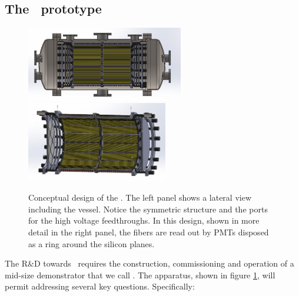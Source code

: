 \subsection{The \HDEMO\ prototype}

\begin{figure}
  \begin{center}
    \includegraphics[width=0.61\textwidth]{img2/nhd_vessel.jpg}
    \includegraphics[width=0.55\textwidth]{img2/nhd_view.jpg}
    \caption{Conceptual design of the \HDEMO. The left panel shows a lateral view including the vessel. Notice the symmetric structure and the ports for
    the high voltage feedthroughs. In this design, shown in more detail in the right panel, the fibers are read out by PMTs disposed as a ring around the silicon planes.} 
    \label{fig.hdemo}
  \end{center}
\end{figure}


\indent


The R\&D towards \NHD\ requires the construction, commissioning and operation of a mid-size demonstrator that we call \HDEMO. The apparatus, shown in figure \ref{fig.hdemo}, will permit addressing several key questions. Specifically:

\indent


